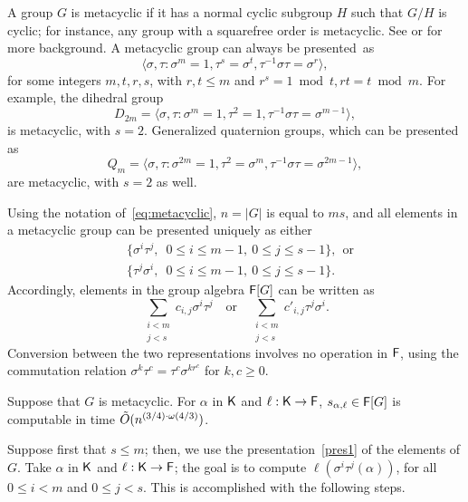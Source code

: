 A group $G$ is metacyclic if it has a normal cyclic subgroup $H$ such that
$G/H$ is cyclic; for instance, any group with a squarefree order is
metacyclic. See \cite[p.~88]{Johnson} or \cite[p.~334]{Curtis} for more
background. A metacyclic group can always be presented~as
\smallskipback
\begin{equation}
  \label{eq:metacyclic}
  \langle \sigma,\tau: \sigma^m = 1,  \tau^s = \sigma^t, \tau^{-1}\sigma \tau = \sigma^r \rangle,
\end{equation}
\smallskipback
for some integers $m,t,r,s$, with $r,t \leq m$ and
$r^s = 1 \bmod t, rt = t \bmod m$. For example, the dihedral group
$$D_{2m} = \langle \sigma,\tau: \sigma^m =1, \tau^2 = 1, \tau^{-1}
\sigma \tau = \sigma^{m-1} \rangle, $$ is metacyclic, with
$s=2$. Generalized quaternion groups, which can be presented as
$$Q_m = \langle \sigma,\tau: \sigma^{2m} =1, \tau^2 = \sigma^m,
\tau^{-1} \sigma \tau = \sigma^{2m-1} \rangle,$$ are metacyclic, with
$s=2$ as well.

Using the notation of~\eqref{eq:metacyclic}, $n=|G|$ is equal to $ms$, and
all elements in a metacyclic group can be presented uniquely as either
\begin{align}
&\{ \sigma^i \tau^j,\,\,\, 0\leq i \leq m-1,\ 0\leq j \leq s-1\}, ~~\text{or}  \label{pres1}\\
&\{ \tau^j\sigma^i,\,\,\, 0\leq i \leq m-1,\ 0\leq j \leq s-1\}. \label{pres2}
\end{align}
Accordingly, elements in the group algebra ${\mathsf{F}}[G]$ can be written as 
$$\sum_{\substack{i <m\\ j< s}} c_{i,j} \sigma^i \tau^j \quad\text{or}\quad
\sum_{\substack{i <m\\ j< s}} c'_{i,j} \tau^j \sigma^i.$$
Conversion between the two representations involves no operation in ${\mathsf{F}}$,
using the commutation relation $\sigma^k \tau^c = \tau^c \sigma^{kr^c}$
for $k,c \ge 0$.

\begin{proposition}
  Suppose that $G$ is metacyclic. For $\alpha$
  in ${\mathsf{K}}$ and $\ell:{\mathsf{K}}\to{\mathsf{F}}$, $s_{\alpha,\ell} \in {\mathsf{F}}[G]$ is
  computable in time $\tilde{O}(n^{(3/4)\cdot \omega(4/3)})$.
\end{proposition}
  Suppose first that $s \le m$; then, we use the
  presentation~\eqref{pres1} of the elements of $G$. Take $\alpha$ in
  ${\mathsf{K}}$ and $\ell:{\mathsf{K}} \to {\mathsf{F}}$; the goal is to compute
  $\ell(\sigma^i\tau^j (\alpha))$, for all $0\leq i < m$ and $0 \leq j
  <s.$ This is accomplished with the following steps.

